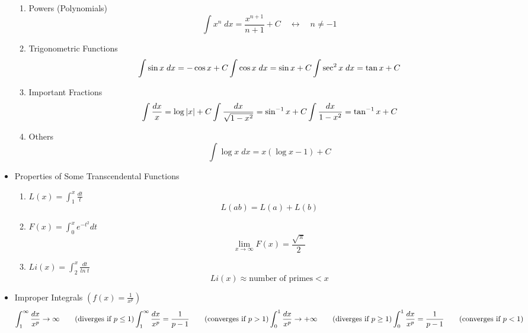\begin{itemize}
			\begin{enumerate}
				\item Powers (Polynomials)
					\begin{equation}
						\int x^n \; dx = \frac{x^{n+1}}{n+1} + C \quad \leftrightarrow \quad n \neq -1
					\end{equation}
				\item Trigonometric Functions
					\begin{equation}
						\int \sin x \; dx = - \cos x + C \\
						\int \cos x \; dx = \sin x + C \\
						\int \sec^2 x \; dx = \tan x + C
					\end{equation}
				\item Important Fractions
					\begin{equation}
						\int \frac{dx}{x} = \log |x|+ C \\
						\int \frac{dx}{\sqrt{1-x^2}} = \sin^{-1} x + C \\
						\int \frac{dx}{1-x^2}= \tan^{-1} x + C
					\end{equation}
				\item Others
					\begin{equation}
						\int \log x \; dx = x(\log x - 1) + C
					\end{equation}
			\end{enumerate}
		\item Properties of Some Transcendental Functions
			\begin{enumerate}
				\item $L(x) = \int_1^{x} \frac{dt}{t}$
					\begin{equation}
						L(ab) = L(a)+L(b)
					\end{equation}
				\item $F(x) = \int_0^x e^{-t^2}dt$
					\begin{equation}
						\lim_{x \rightarrow \infty} F(x) = \frac{\sqrt{\pi}}{2}
					\end{equation}
				\item $Li(x) = \int_2^x \frac{dt}{ln \; t}$
					\begin{equation}
						Li(x) \approx \textrm{number of primes} < x
					\end{equation}
			\end{enumerate}
		\item Improper Integrals $\left( f(x) = \frac{1}{x^p} \right)$
			\begin{equation}
				\int_1^{\infty} \frac{dx}{x^p} \rightarrow \infty \qquad \textrm{(diverges if } p \leq 1) \\
				\int_1^{\infty} \frac{dx}{x^p} = \frac{1}{p-1} \qquad \textrm{(converges if } p > 1) \\
				\int_0^1 \frac{dx}{x^p} \rightarrow + \infty \qquad \textrm{(diverges if } p \geq 1) \\
				\int_0^1 \frac{dx}{x^p} = \frac{1}{p-1} \qquad \textrm{(converges if } p < 1)
			\end{equation}
	\end{itemize}
